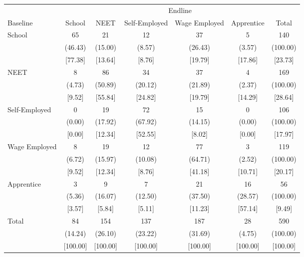{
\def\sym#1{\ifmmode^{#1}\else\(^{#1}\)\fi}
\begin{tabular}{l*{6}{c}}
\hline\hline
            &\multicolumn{6}{c}{Endline}                                                  \\
Baseline    &      School&        NEET&Self-Employed&Wage Employed&  Apprentice&       Total\\
\hline
School      &          65&          21&          12&          37&           5&         140\\
            &     (46.43)&     (15.00)&      (8.57)&     (26.43)&      (3.57)&    (100.00)\\
            &     [77.38]&     [13.64]&      [8.76]&     [19.79]&     [17.86]&     [23.73]\\
NEET        &           8&          86&          34&          37&           4&         169\\
            &      (4.73)&     (50.89)&     (20.12)&     (21.89)&      (2.37)&    (100.00)\\
            &      [9.52]&     [55.84]&     [24.82]&     [19.79]&     [14.29]&     [28.64]\\
Self-Employed&           0&          19&          72&          15&           0&         106\\
            &      (0.00)&     (17.92)&     (67.92)&     (14.15)&      (0.00)&    (100.00)\\
            &      [0.00]&     [12.34]&     [52.55]&      [8.02]&      [0.00]&     [17.97]\\
Wage Employed&           8&          19&          12&          77&           3&         119\\
            &      (6.72)&     (15.97)&     (10.08)&     (64.71)&      (2.52)&    (100.00)\\
            &      [9.52]&     [12.34]&      [8.76]&     [41.18]&     [10.71]&     [20.17]\\
Apprentice  &           3&           9&           7&          21&          16&          56\\
            &      (5.36)&     (16.07)&     (12.50)&     (37.50)&     (28.57)&    (100.00)\\
            &      [3.57]&      [5.84]&      [5.11]&     [11.23]&     [57.14]&      [9.49]\\
Total       &          84&         154&         137&         187&          28&         590\\
            &     (14.24)&     (26.10)&     (23.22)&     (31.69)&      (4.75)&    (100.00)\\
            &    [100.00]&    [100.00]&    [100.00]&    [100.00]&    [100.00]&    [100.00]\\
\hline\hline
\end{tabular}
}
